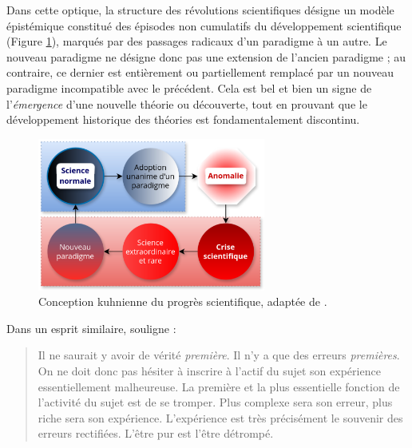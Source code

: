 Dans cette optique, la structure des révolutions scientifiques désigne un modèle épistémique  constitué des épisodes non cumulatifs du développement scientifique (Figure \ref{fig:changement_paradigme}), marqués par des passages radicaux d'un paradigme à un autre. Le nouveau paradigme ne désigne donc pas une extension de l'ancien paradigme ; au contraire, ce dernier est entièrement ou partiellement remplacé par un nouveau paradigme incompatible avec le précédent. Cela est bel et bien un signe de l'\textit{émergence} d'une nouvelle théorie ou découverte, tout en prouvant que le développement historique des théories est fondamentalement discontinu. 

\begin{figure}[h!]
    \centering
    \includegraphics[width=75mm,scale=0.5]{img/changement_paradigme.png}
    \caption{Conception kuhnienne du progrès scientifique, adaptée de \citet{amiri2012}.}
    \label{fig:changement_paradigme}
\end{figure}

\newpage 
Dans un esprit similaire, \citet[p. 72]{bachelard1970idealisme} souligne :

%

\begin{quote} 

\og{}Il ne saurait y avoir de vérité \textit{première}.  Il n'y a que des erreurs \textit{premières}. On ne doit donc pas hésiter à inscrire à l'actif du sujet son expérience essentiellement malheureuse. La première et la plus essentielle fonction de l'activité du sujet est de se tromper. Plus complexe sera son erreur, plus riche sera son expérience. L'expérience est très précisément le souvenir des erreurs rectifiées. L'être pur est l'être détrompé. \fg{} 

\end{quote}

